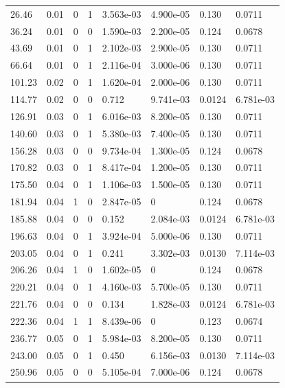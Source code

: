 \documentclass[preview]{standalone}
\begin{document}
{{\begin{tabular}{L{1.2cm}C{1.2cm} C{0.3cm}C{0.5cm} C{1.4cm}C{1.4cm} C{1.4cm}C{1.4cm}}
  26.46  &  0.01  & 0     &  1 &  3.563e-03  & 4.900e-05  & 0.130 &  0.0711   \\ 
  36.24  &  0.01  & 0     &  0 &  1.590e-03  & 2.200e-05  & 0.124 &  0.0678   \\ 
  43.69  &  0.01  & 0     &  1 &  2.102e-03  & 2.900e-05  & 0.130 &  0.0711   \\ 
  66.64  &  0.01  & 0     &  1 &  2.116e-04  & 3.000e-06  & 0.130 &  0.0711   \\ 
  101.23  &  0.02  & 0     &  1 &  1.620e-04  & 2.000e-06  & 0.130 &  0.0711   \\ 
  114.77  &  0.02  & 0     &  0 &  0.712  & 9.741e-03  & 0.0124 &  6.781e-03   \\ 
  126.91  &  0.03  & 0     &  1 &  6.016e-03  & 8.200e-05  & 0.130 &  0.0711   \\ 
  140.60  &  0.03  & 0     &  1 &  5.380e-03  & 7.400e-05  & 0.130 &  0.0711   \\ 
  156.28  &  0.03  & 0     &  0 &  9.734e-04  & 1.300e-05  & 0.124 &  0.0678   \\ 
  170.82  &  0.03  & 0     &  1 &  8.417e-04  & 1.200e-05  & 0.130 &  0.0711   \\ 
  175.50  &  0.04  & 0     &  1 &  1.106e-03  & 1.500e-05  & 0.130 &  0.0711   \\ 
  181.94  &  0.04  & 1     &  0 &  2.847e-05  & 0  & 0.124 &  0.0678   \\ 
  185.88  &  0.04  & 0     &  0 &  0.152  & 2.084e-03  & 0.0124 &  6.781e-03   \\ 
  196.63  &  0.04  & 0     &  1 &  3.924e-04  & 5.000e-06  & 0.130 &  0.0711   \\ 
  203.05  &  0.04  & 0     &  1 &  0.241  & 3.302e-03  & 0.0130 &  7.114e-03   \\ 
  206.26  &  0.04  & 1     &  0 &  1.602e-05  & 0  & 0.124 &  0.0678   \\ 
  220.21  &  0.04  & 0     &  1 &  4.160e-03  & 5.700e-05  & 0.130 &  0.0711   \\ 
  221.76  &  0.04  & 0     &  0 &  0.134  & 1.828e-03  & 0.0124 &  6.781e-03   \\ 
  222.36  &  0.04  & 1     &  1 &  8.439e-06  & 0  & 0.123 &  0.0674   \\ 
  236.77  &  0.05  & 0     &  1 &  5.984e-03  & 8.200e-05  & 0.130 &  0.0711   \\ 
  243.00  &  0.05  & 0     &  1 &  0.450  & 6.156e-03  & 0.0130 &  7.114e-03   \\ 
  250.96  &  0.05  & 0     &  0 &  5.105e-04  & 7.000e-06  & 0.124 &  0.0678   \\ 

\end{tabular}}}
\end{document}
